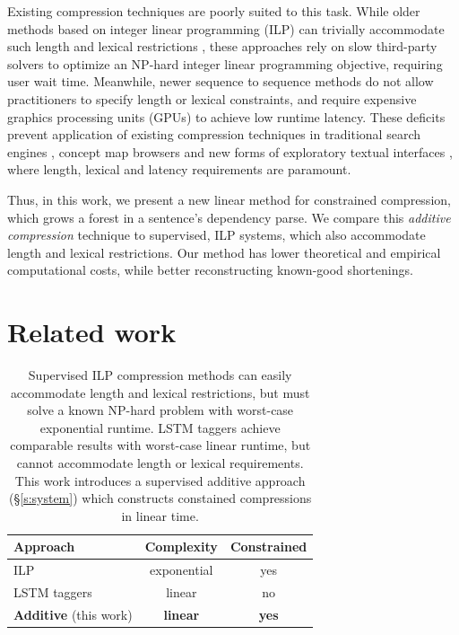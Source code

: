 \documentclass[11pt,a4paper]{article}
\begin{document}
Existing compression techniques are poorly suited to this task. While older methods based on integer linear programming (ILP) can trivially accommodate such length and lexical restrictions \cite{clarke2008global,filippova2013overcoming}, these approaches rely on slow third-party solvers to optimize an NP-hard integer linear programming objective\label{s:relatedwork}, requiring user wait time. Meanwhile, newer sequence to sequence methods \cite{filippova2015sentence} do not allow practitioners to specify length or lexical constraints, and require expensive graphics processing units (GPUs) to achieve low runtime latency. These deficits prevent application of existing compression techniques in traditional search engines \cite{hearst2009search}, concept map browsers \cite{falke2017graphdocexplore} and new forms of exploratory textual interfaces \cite{marchionini2006exploratory}, where length, lexical and latency requirements are paramount. 

Thus, in this work, we present a new linear method for constrained compression, which grows a forest in a sentence's dependency parse. We compare this \textit{additive compression} technique to supervised, ILP systems, which also accommodate length and lexical restrictions. Our method has lower theoretical and empirical computational costs, while better reconstructing known-good shortenings. 

\section{Related work}\label{s:relatedwork}


\begin{table}[htb!]
\begin{tabular}{lcc}
\textbf{Approach} & \textbf{Complexity} & \textbf{Constrained}  \\ \hline
ILP       &   exponential    & yes     \\
LSTM taggers   & linear              & no         \\   
\textbf{Additive} {\small (this work)}  & \textbf{linear}     &      \textbf{yes}   
\end{tabular}
\caption{Supervised ILP compression methods \cite{clarke2008global,filippova2013overcoming,Wang2017CanSH} can easily accommodate length and lexical restrictions, but must solve a known NP-hard problem with worst-case exponential runtime. LSTM taggers \cite{filippova2015sentence} achieve comparable results with worst-case linear runtime, but cannot accommodate length or lexical requirements. This work introduces a supervised additive approach (\S\ref{s:system}) which constructs constained compressions in linear time.} 
\label{t:algos}
\end{table}
\end{document}
